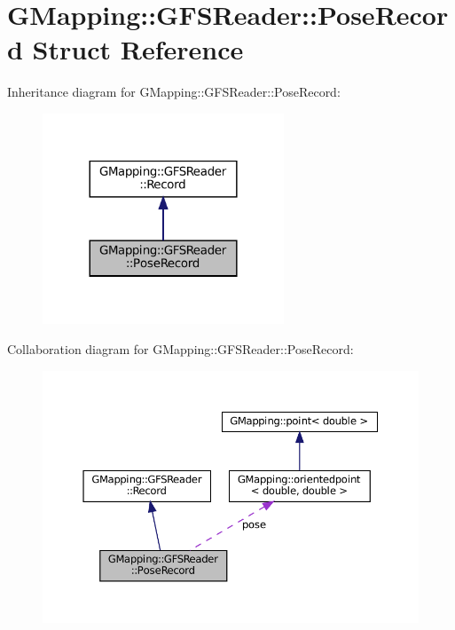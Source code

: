 \hypertarget{structGMapping_1_1GFSReader_1_1PoseRecord}{}\section{G\+Mapping\+:\+:G\+F\+S\+Reader\+:\+:Pose\+Record Struct Reference}
\label{structGMapping_1_1GFSReader_1_1PoseRecord}


Inheritance diagram for G\+Mapping\+:\+:G\+F\+S\+Reader\+:\+:Pose\+Record\+:
\nopagebreak
\begin{figure}[H]
\begin{center}
\leavevmode
\includegraphics[width=204pt]{structGMapping_1_1GFSReader_1_1PoseRecord__inherit__graph}
\end{center}
\end{figure}


Collaboration diagram for G\+Mapping\+:\+:G\+F\+S\+Reader\+:\+:Pose\+Record\+:
\nopagebreak
\begin{figure}[H]
\begin{center}
\leavevmode
\includegraphics[width=350pt]{structGMapping_1_1GFSReader_1_1PoseRecord__coll__graph}
\end{center}
\end{figure}

